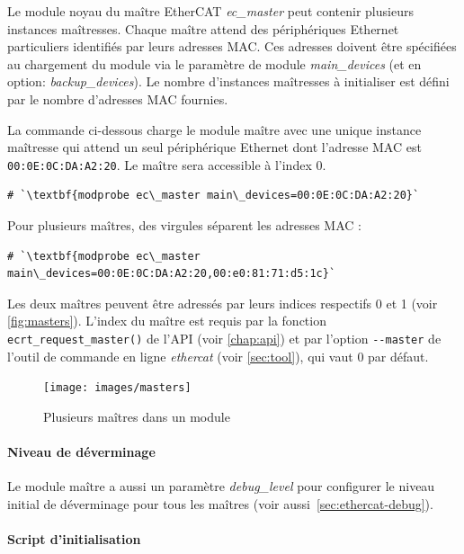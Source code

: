 \documentclass[a4paper,12pt,BCOR=6mm,bibtotoc,idxtotoc]{scrbook}
\begin{document}
Le module noyau du ma\^itre EtherCAT \textit{ec\_master} peut contenir
plusieurs instances ma\^itresses. Chaque ma\^itre attend des
p\'eriph\'eriques Ethernet particuliers identifi\'es par leurs adresses
MAC. Ces adresses doivent \^etre sp\'ecifi\'ees au
chargement du module via le param\`etre de module
\textit{main\_devices} (et en option: \textit{backup\_devices}). Le
nombre d'instances ma\^itresses \`a initialiser est d\'efini par le
nombre d'adresses MAC fournies.

La commande ci-dessous charge le module ma\^itre avec une unique
instance ma\^itresse qui attend un seul p\'eriph\'erique Ethernet dont
l'adresse MAC est \lstinline+00:0E:0C:DA:A2:20+. Le ma\^itre sera
accessible \`a l'index $0$.

\begin{lstlisting}
# `\textbf{modprobe ec\_master main\_devices=00:0E:0C:DA:A2:20}`
\end{lstlisting}

Pour plusieurs ma\^itres, des virgules s\'eparent les adresses MAC :

\begin{lstlisting}
# `\textbf{modprobe ec\_master main\_devices=00:0E:0C:DA:A2:20,00:e0:81:71:d5:1c}`
\end{lstlisting}

Les deux ma\^itres peuvent \^etre adress\'es par leurs indices
respectifs 0 et 1 (voir \autoref{fig:masters}). L'index du ma\^itre
est requis par la fonction \lstinline+ecrt_request_master()+ de l'API
(voir \autoref{chap:api}) et par l'option \lstinline+--master+ de
l'outil de commande en ligne \textit{ethercat} (voir
\autoref{sec:tool}), qui vaut $0$ par d\'efaut.

\begin{figure}[htbp]
  \centering
  \texttt{[image: images/masters]}
  \caption{Plusieurs ma\^itres dans un module}
  \label{fig:masters}
\end{figure}

\paragraph{Niveau de d\'everminage} Le module ma\^itre a aussi un
param\`etre \textit{debug\_level} pour configurer le niveau initial de
d\'everminage pour tous les ma\^itres (voir
aussi~\autoref{sec:ethercat-debug}).

\paragraph{Script d'initialisation}
\end{document}
